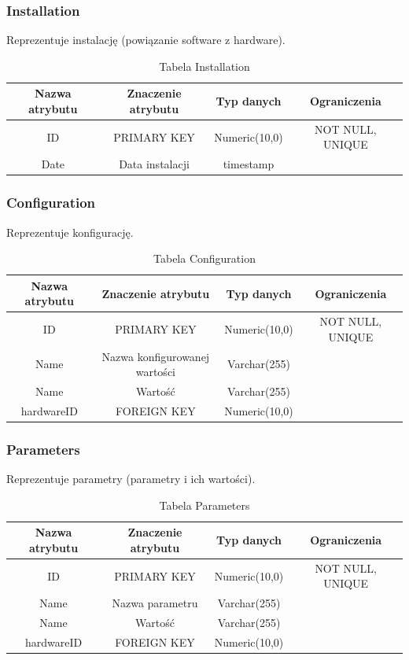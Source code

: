 \subsubsection{Installation}
Reprezentuje instalację (powiązanie software z hardware).
\begin{table}[H]
	\renewcommand\arraystretch{1.5}
	\renewcommand\tabcolsep{3pt}
	\begin{tabular}{| c | c | c | c |} 
		\hline \textbf{Nazwa atrybutu} & \textbf{Znaczenie atrybutu} & \textbf{Typ danych} & \textbf{Ograniczenia} \\ 
		\hline ID & PRIMARY KEY & Numeric(10,0) & NOT NULL, UNIQUE \\ 
		\hline Date & Data instalacji & timestamp &  \\ 
		\hline 
	\end{tabular} 
	\caption{Tabela Installation}
	\label{TAB:Installation}
\end{table}

\subsubsection{Configuration}
Reprezentuje konfigurację.
\begin{table}[H]
	\renewcommand\arraystretch{1.5}
	\renewcommand\tabcolsep{3pt}
	\begin{tabular}{| c | c | c | c |} 
		\hline \textbf{Nazwa atrybutu} & \textbf{Znaczenie atrybutu} & \textbf{Typ danych} & \textbf{Ograniczenia} \\ 
		\hline ID & PRIMARY KEY & Numeric(10,0) & NOT NULL, UNIQUE \\ 
		\hline Name & Nazwa konfigurowanej wartości & Varchar(255) &  \\ 
		\hline Name & Wartość & Varchar(255) &  \\
		\hline hardwareID & FOREIGN KEY & Numeric(10,0) & \\ 
		\hline 
	\end{tabular} 
	\caption{Tabela Configuration}
	\label{TAB:Configuration}
\end{table}

\subsubsection{Parameters}
Reprezentuje parametry (parametry i ich wartości).
\begin{table}[H]
	\renewcommand\arraystretch{1.5}
	\renewcommand\tabcolsep{3pt}
	\begin{tabular}{| c | c | c | c |} 
		\hline \textbf{Nazwa atrybutu} & \textbf{Znaczenie atrybutu} & \textbf{Typ danych} & \textbf{Ograniczenia} \\ 
		\hline ID & PRIMARY KEY & Numeric(10,0) & NOT NULL, UNIQUE \\ 
		\hline Name & Nazwa parametru & Varchar(255) &  \\ 
		\hline Name & Wartość & Varchar(255) &  \\
		\hline hardwareID & FOREIGN KEY & Numeric(10,0) & \\ 
		\hline 
	\end{tabular} 
	\caption{Tabela Parameters}
	\label{TAB:Parameters}
\end{table}

